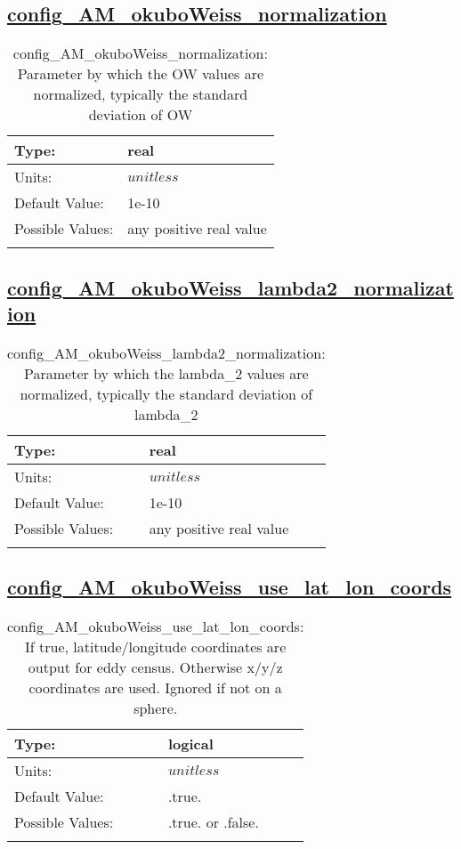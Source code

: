 \subsection[config\_AM\_okuboWeiss\_normalization]{\hyperref[sec:nm_tab_AM_okuboWeiss]{config\_AM\_okuboWeiss\_normalization}}
\label{subsec:nm_sec_config_AM_okuboWeiss_normalization}
\begin{center}
\begin{longtable}{| p{2.0in} || p{4.0in} |}
    \hline
    Type: & real \\
    \hline
    Units: & $unitless$ \\
    \hline
    Default Value: & 1e-10 \\
    \hline
    Possible Values: & any positive real value \\
    \hline
    \caption{config\_AM\_okuboWeiss\_normalization: Parameter by which the OW values are normalized, typically the standard deviation of OW}
\end{longtable}
\end{center}
\subsection[config\_AM\_okuboWeiss\_lambda2\_normalization]{\hyperref[sec:nm_tab_AM_okuboWeiss]{config\_AM\_okuboWeiss\_lambda2\_normalization}}
\label{subsec:nm_sec_config_AM_okuboWeiss_lambda2_normalization}
\begin{center}
\begin{longtable}{| p{2.0in} || p{4.0in} |}
    \hline
    Type: & real \\
    \hline
    Units: & $unitless$ \\
    \hline
    Default Value: & 1e-10 \\
    \hline
    Possible Values: & any positive real value \\
    \hline
    \caption{config\_AM\_okuboWeiss\_lambda2\_normalization: Parameter by which the lambda\_2 values are normalized, typically the standard deviation of lambda\_2}
\end{longtable}
\end{center}
\subsection[config\_AM\_okuboWeiss\_use\_lat\_lon\_coords]{\hyperref[sec:nm_tab_AM_okuboWeiss]{config\_AM\_okuboWeiss\_use\_lat\_lon\_coords}}
\label{subsec:nm_sec_config_AM_okuboWeiss_use_lat_lon_coords}
\begin{center}
\begin{longtable}{| p{2.0in} || p{4.0in} |}
    \hline
    Type: & logical \\
    \hline
    Units: & $unitless$ \\
    \hline
    Default Value: & .true. \\
    \hline
    Possible Values: & .true. or .false. \\
    \hline
    \caption{config\_AM\_okuboWeiss\_use\_lat\_lon\_coords: If true, latitude/longitude coordinates are output for eddy census. Otherwise x/y/z coordinates are used. Ignored if not on a sphere.}
\end{longtable}
\end{center}
